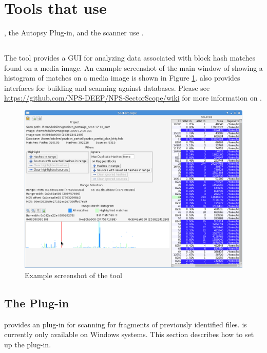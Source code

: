 \documentclass[11pt,fleqn]{article} %
\begin{document}
\section{Tools that use \hdb}
\label{OtherTools}
\sscope, the \sscope Autopsy Plug-in, and the \bulk \hdb scanner use \hdb.

\subsection{\sscope}
The \sscope tool provides a GUI for analyzing data associated with block hash matches found on a media image. An example screenshot of the main window of \sscope showing a histogram of matches on a media image is shown in Figure \ref{fig:SectorScope_main}. \sscope also provides interfaces for building and scanning against \hdb databases. Please see \url{https://github.com/NPS-DEEP/NPS-SectorScope/wiki} for more information on \sscope.

\begin{figure}
	\center
	\includegraphics[scale=.45]{drawings/SectorScope_main}
	\caption{Example screenshot of the \sscope tool}
	\label{fig:SectorScope_main}
\end{figure}

\subsection{The \sscope \aut Plug-in}
\sscope provides an \aut plug-in for scanning for fragments of previously identified files. \aut is currently only available on Windows systems. This section describes how to set up the \sscope \aut plug-in.
\end{document}
